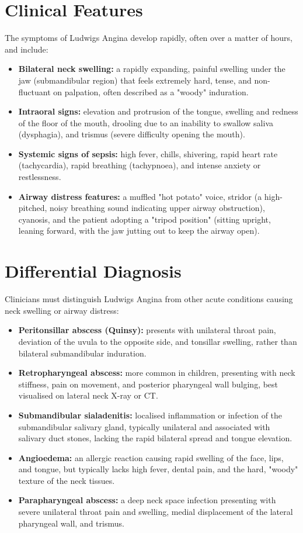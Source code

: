 \section*{Clinical Features}
The symptoms of Ludwigs Angina develop rapidly, often over a matter of hours, and include:
\begin{itemize}
    \item \textbf{Bilateral neck swelling:} a rapidly expanding, painful swelling under the jaw (submandibular region) that feels extremely hard, tense, and non-fluctuant on palpation, often described as a "woody" induration.
    \item \textbf{Intraoral signs:} elevation and protrusion of the tongue, swelling and redness of the floor of the mouth, drooling due to an inability to swallow saliva (dysphagia), and trismus (severe difficulty opening the mouth).
    \item \textbf{Systemic signs of sepsis:} high fever, chills, shivering, rapid heart rate (tachycardia), rapid breathing (tachypnoea), and intense anxiety or restlessness.
    \item \textbf{Airway distress features:} a muffled "hot potato" voice, stridor (a high-pitched, noisy breathing sound indicating upper airway obstruction), cyanosis, and the patient adopting a "tripod position" (sitting upright, leaning forward, with the jaw jutting out to keep the airway open).
\end{itemize}

\section*{Differential Diagnosis}
Clinicians must distinguish Ludwigs Angina from other acute conditions causing neck swelling or airway distress:
\begin{itemize}
    \item \textbf{Peritonsillar abscess (Quinsy):} presents with unilateral throat pain, deviation of the uvula to the opposite side, and tonsillar swelling, rather than bilateral submandibular induration.
    \item \textbf{Retropharyngeal abscess:} more common in children, presenting with neck stiffness, pain on movement, and posterior pharyngeal wall bulging, best visualised on lateral neck X-ray or CT.
    \item \textbf{Submandibular sialadenitis:} localised inflammation or infection of the submandibular salivary gland, typically unilateral and associated with salivary duct stones, lacking the rapid bilateral spread and tongue elevation.
    \item \textbf{Angioedema:} an allergic reaction causing rapid swelling of the face, lips, and tongue, but typically lacks high fever, dental pain, and the hard, "woody" texture of the neck tissues.
    \item \textbf{Parapharyngeal abscess:} a deep neck space infection presenting with severe unilateral throat pain and swelling, medial displacement of the lateral pharyngeal wall, and trismus.
\end{itemize}

